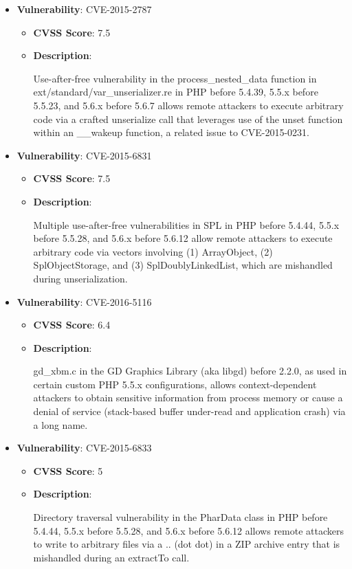 \documentclass{article}
\begin{document}
\begin{itemize}
        \item \textbf{Vulnerability}: CVE-2015-2787
        \begin{itemize}
            \item \textbf{CVSS Score}:  7.5 
            \item \textbf{Description}:
            \parbox[t]{0.9\linewidth}{
                \ttfamily Use-after-free vulnerability in the process\_nested\_data function in ext/standard/var\_unserializer.re in PHP before 5.4.39, 5.5.x before 5.5.23, and 5.6.x before 5.6.7 allows remote attackers to execute arbitrary code via a crafted unserialize call that leverages use of the unset function within an \_\_wakeup function, a related issue to CVE-2015-0231.
            }
        \end{itemize}
    
        \item \textbf{Vulnerability}: CVE-2015-6831
        \begin{itemize}
            \item \textbf{CVSS Score}:  7.5 
            \item \textbf{Description}:
            \parbox[t]{0.9\linewidth}{
                \ttfamily Multiple use-after-free vulnerabilities in SPL in PHP before 5.4.44, 5.5.x before 5.5.28, and 5.6.x before 5.6.12 allow remote attackers to execute arbitrary code via vectors involving (1) ArrayObject, (2) SplObjectStorage, and (3) SplDoublyLinkedList, which are mishandled during unserialization.
            }
        \end{itemize}
    
        \item \textbf{Vulnerability}: CVE-2016-5116
        \begin{itemize}
            \item \textbf{CVSS Score}:  6.4 
            \item \textbf{Description}:
            \parbox[t]{0.9\linewidth}{
                \ttfamily gd\_xbm.c in the GD Graphics Library (aka libgd) before 2.2.0, as used in certain custom PHP 5.5.x configurations, allows context-dependent attackers to obtain sensitive information from process memory or cause a denial of service (stack-based buffer under-read and application crash) via a long name.
            }
        \end{itemize}
    
        \item \textbf{Vulnerability}: CVE-2015-6833
        \begin{itemize}
            \item \textbf{CVSS Score}:  5 
            \item \textbf{Description}:
            \parbox[t]{0.9\linewidth}{
                \ttfamily Directory traversal vulnerability in the PharData class in PHP before 5.4.44, 5.5.x before 5.5.28, and 5.6.x before 5.6.12 allows remote attackers to write to arbitrary files via a .. (dot dot) in a ZIP archive entry that is mishandled during an extractTo call.
            }
        \end{itemize}
    

\end{itemize}
\end{document}
